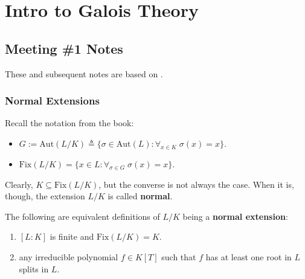 \documentclass{template}
\begin{document}
\chapter{Intro to Galois Theory}

\section{Meeting \#1 Notes}

These and subsequent notes are based on \cite{artin-galois}.

\subsection{Normal Extensions}

Recall the notation from the book:
\begin{itemize}
    \item $G := \text{Aut}(L/K) \triangleq \{\sigma \in \text{Aut}(L): \forall_{x \in K} \; \sigma(x) = x\}$.
    \item $\text{Fix}(L/K) = \{x \in L: \forall_{\sigma \in G}\; \sigma(x) = x\}$.
\end{itemize}

Clearly, $K \subseteq \text{Fix}(L/K)$, but the converse is not always the case.
When it is, though, the extension $L/K$ is called \textbf{normal}.

\begin{definition}
    The following are equivalent definitions of $L/K$ being a
    \textbf{normal extension}:
    \begin{enumerate}
        \item[(a)] $[L:K]$ is finite and $\text{Fix}(L/K) = K$.
        \item[(b)] any irreducible polynomial $f \in K[T]$ such that $f$ has at
        least one root in $L$ splits in $L$.
    \end{enumerate}
\end{definition}
\end{document}
